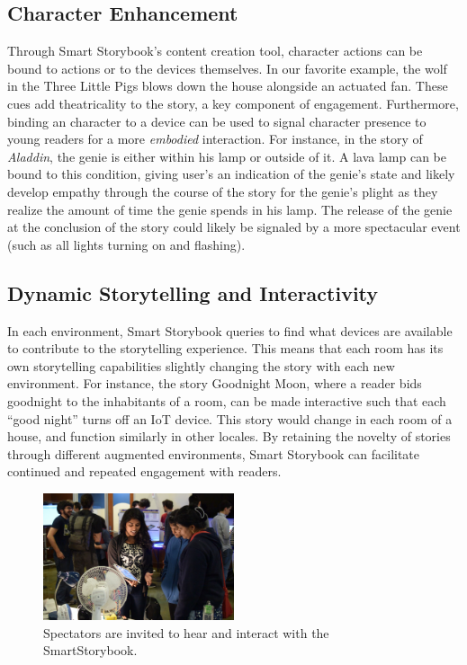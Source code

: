 \documentclass{sigchi}
\newcommand\name{SmartStorybook}
\begin{document}
\subsection{Character Enhancement}
Through Smart Storybook's content creation tool, character actions can be bound to actions or to the devices themselves. In our favorite example, the wolf in the Three Little Pigs blows down the house alongside an actuated fan. These cues add theatricality to the story, a key component of engagement. Furthermore, binding an character to a device can be used to signal character presence to young readers for a more \textit{embodied} interaction. For instance, in the story of \textit{Aladdin}, the genie is either within his lamp or outside of it. A lava lamp can be bound to this condition, giving user's an indication of the genie's state and likely develop empathy through the course of the story for the genie's plight as they realize the amount of time the genie spends in his lamp. The release of the genie at the conclusion of the story could likely be signaled by a more spectacular event (such as all lights turning on and flashing). 


\subsection{Dynamic Storytelling and Interactivity}
In each environment, Smart Storybook queries to find what devices are available to contribute to the storytelling experience. This means that each room has its own storytelling capabilities slightly changing the story with each new environment. For instance, the story Goodnight Moon, where a reader bids goodnight to the inhabitants of a room, can be made interactive such that each ``good night'' turns off an IoT device. This story would change in each room of a house, and function similarly in other locales. By retaining the novelty of stories through different augmented environments, Smart Storybook can facilitate continued and repeated engagement with readers. 



\begin{figure}[t!]
    \centering
    \includegraphics[keepaspectratio, width=0.5\textwidth]{figures/demo.jpg} 
    \caption{Spectators are invited to hear and interact with the \name.}
    \vspace{-10pt}
    \label{fig:demo} 
  \end{figure}
\end{document}
